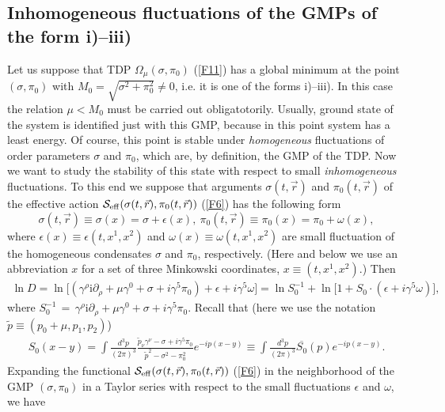 \documentclass[12pt,a4paper]{article}
\begin{document}
\subsection{Inhomogeneous fluctuations of the GMPs of the form i)--iii)}

Let us suppose that TDP $\Omega_\mu (\sigma,\pi_0)$ (\ref{F11}) has a global minimum at
the point $(\sigma,\pi_0)$ with $M_0=\sqrt{\sigma^2+\pi_0^2}\ne 0$, i.e. it is one of the forms i)--iii). In this case the relation $\mu<M_0$ must be carried out obligatotorily. Usually, ground state of the system is identified just with this
GMP, because in this point system has a least energy. Of course, this point is stable under
{\it homogeneous} fluctuations of order parameters $\sigma$ and $\pi_0$, which are, by definition, the GMP of
the TDP. Now we want to study the stability of this state with respect to small
{\it inhomogeneous} fluctuations. To this end we suppose that arguments $\sigma (t,\vec r)$ and
$\pi_0(t,\vec r)$ of the effective action ${\cal S}_{\rm {eff}}(\sigma(t,\vec r),\pi_0(t,\vec r))$ (\ref{F6}) has the following form
$$\sigma(t,\vec r)\equiv\sigma(x)=\sigma+\epsilon (x),~\pi_0(t,\vec r)\equiv\pi_0(x)=\pi_0+\omega (x),$$
where $\epsilon (x)\equiv\epsilon (t,x^1,x^2)$ and $\omega (x)\equiv\omega (t,x^1,x^2)$ are
small fluctuation of the homogeneous condensates $\sigma$ and $\pi_0$, respectively.
(Here and below we use an abbreviation $x$ for a set of three Minkowski coordinates,
$x\equiv (t,x^1,x^2)$.) Then
\begin{eqnarray}
\ln D=\ln \big[(\gamma^\rho\mathrm{i}\partial_\rho
+\mu\gamma^0+\sigma+i\gamma^5\pi_0)+\epsilon+i\gamma^5\omega\big]=\ln S_0^{-1}+\ln
\big[1+S_0\cdot (\epsilon+i\gamma^5\omega)\big],
\label{F14}
\end{eqnarray}
where $S_0^{-1}\,=\,\gamma^\rho\mathrm{i}\partial_\rho
+\mu\gamma^0+\sigma+i\gamma^5\pi_0$. Recall that (here we use the notation $\tilde p\equiv (p_0+\mu,p_1,p_2)$)
\begin{eqnarray}
S_0(x-y)=\int\frac{d^3p}{(2\pi)^3}\frac{\tilde p_\nu\gamma^\nu-\sigma+i\gamma^5\pi_0}
{\tilde p^2-\sigma^2-\pi_0^2}e^{-ip(x-y)}\equiv \int\frac{d^3p}{(2\pi)^3}\overline{S_0}(p)
e^{-ip(x-y)}.
\label{F15}
\end{eqnarray}
Expanding the functional ${\cal S}_{\rm {eff}}(\sigma(t,\vec r),\pi_0(t,\vec r))$ (\ref{F6})  in the neighborhood of the GMP $(\sigma,\pi_0)$ in a Taylor series with respect to the small fluctuations $\epsilon$ and $\omega$, we have
\end{document}
